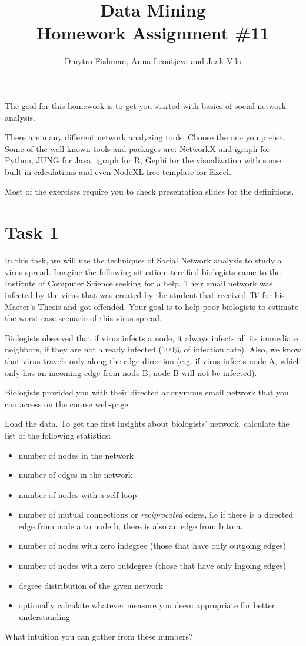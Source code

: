 \documentclass{article}
\title{Data Mining\\Homework Assignment \#11} %
\author{Dmytro Fishman, Anna Leontjeva and Jaak Vilo} %
\begin{document}
\maketitle %
The goal for this homework is to get you started with basics of social network analysis. 

There are many different network analyzing tools. Choose the one you prefer. Some of the well-known tools and packages are: NetworkX and igraph for Python, JUNG for Java, igraph for R, Gephi for the visualization with some built-in calculations and even NodeXL free template for Excel.

Most of the exercises require you to check presentation slides for the definitions.

\section*{Task 1}
In this task, we will use the techniques of Social Network analysis to study a virus spread. Imagine the following situation: terrified biologists came to the Institute of Computer Science seeking for a help. Their email network was infected by the virus that was created by the student that received 'B' for his Master's Thesis and got offended. Your goal is to help poor biologists to estimate the worst-case scenario of this virus spread. 

Biologists observed that if virus infects a node, it always infects all its immediate neighbors, if they are not already infected (100\% of infection rate). Also, we know that virus travels only along the edge direction (e.g. if virus infects node A, which only has an incoming edge from node B, node B will not be infected). 

Biologists provided you with their directed anonymous email network that you can access on the course web-page. 
  
Load the data. To get the first insights about biologists' network, calculate the list of the following statistics:
\begin{itemize}
\item number of nodes in the network
\item number of edges in the network
\item number of nodes with a self-loop
\item number of mutual connections or \emph{reciprocated} edges, i.e if there is a directed edge from node a to node b, there is also an edge from b to a. 
\item number of nodes with zero indegree (those that have only outgoing edges)
\item number of nodes with zero outdegree (those that have only ingoing edges)
\item degree distribution of the given network
\item optionally calculate whatever measure you deem appropriate for better understanding
\end{itemize}
What intuition you can gather from these numbers?
\end{document}
